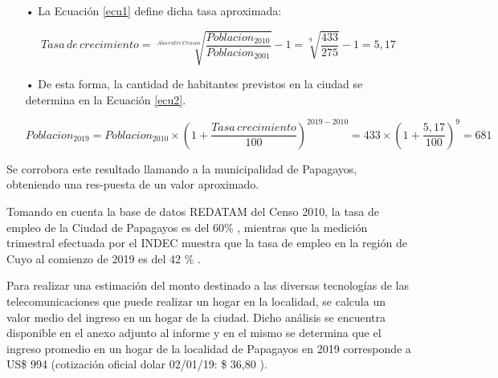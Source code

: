 \begin{enumerate}
\item[•]La Ecuación \ref{ecu1} define dicha tasa aproximada:

\begin{equation}
Tasa\, de \, crecimiento= \sqrt[A\tilde{n}o\, entre \, Censos]{  \frac{Poblacion_{2010}}{Poblacion_{2001}}  } -1 =\sqrt[9]{  \frac{433}{275}  } -1 = 5,17%
\label{ecu1}
\end{equation}

\item[•]De esta forma, la cantidad de habitantes previstos en la ciudad se determina en la Ecuación \ref{ecu2}.

\begin{equation}
Poblacion_{2019}=Poblacion_{2010} \times \left ( 1 + \frac{Tasa \, crecimiento}{100} \right )^{2019-2010}=433 \times \left ( 1 + \frac{5,17}{100} \right )^{9}=681
\label{ecu2}
\end{equation}

\end{enumerate}

Se corrobora este resultado llamando a la municipalidad de Papagayos, obteniendo una res-puesta de un valor aproximado.


Tomando en cuenta la base de datos REDATAM del Censo 2010, la tasa de empleo de la Ciudad de Papagayos es del 60\% \cite{ocupacion}, mientras que la medición trimestral efectuada por el INDEC muestra que la tasa de empleo en la región de Cuyo al comienzo de 2019 es del 42 \% \cite{base-datos-abiertos}. 


Para realizar una estimación del monto destinado a las diversas tecnologías de las telecomunicaciones que puede realizar un hogar en la localidad, se calcula un valor medio del ingreso en un hogar de la ciudad. Dicho análisis se encuentra disponible en el anexo adjunto al informe y en el mismo se determina que el ingreso promedio en un hogar de la localidad de Papagayos en 2019 corresponde a US\$ 994 (cotización oficial dolar 02/01/19: \$ 36,80 ). 



